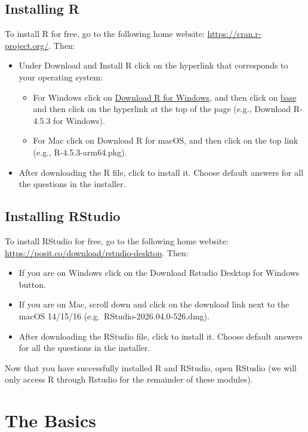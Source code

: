\documentclass[
]{book}
\begin{document}
\section{Installing R}\label{installing-r}

To install R for free, go to the following home website: \url{https://cran.r-project.org/}. Then:

\begin{itemize}
\item
  Under Download and Install R click on the hyperlink that corresponds to your operating system:

  \begin{itemize}
  \item
    For Windows click on \ul{Download R for Windows}, and then click on \ul{base} and then click on the hyperlink at the top of the page (e.g., Download R-4.5.3 for Windows).
  \item
    For Mac click on Download R for macOS, and then click on the top link (e.g., R-4.5.3-arm64.pkg).
  \end{itemize}
\item
  After downloading the R file, click to install it. Choose default answers for all the questions in the installer.
\end{itemize}

\section{Installing RStudio}\label{installing-rstudio}

To install RStudio for free, go to the following home website: \url{https://posit.co/download/rstudio-desktop}. Then:

\begin{itemize}
\item
  If you are on Windows click on the Download Rstudio Desktop for Windows button.
\item
  If you are on Mac, scroll down and click on the download link next to the macOS 14/15/16 (e.g.~RStudio-2026.04.0-526.dmg).
\item
  After downloading the RStudio file, click to install it. Choose default answers for all the questions in the installer.
\end{itemize}

Now that you have successfully installed R and RStudio, open RStudio (we will only access R through Rstudio for the remainder of these modules).

\chapter{The Basics}\label{basics}
\end{document}
